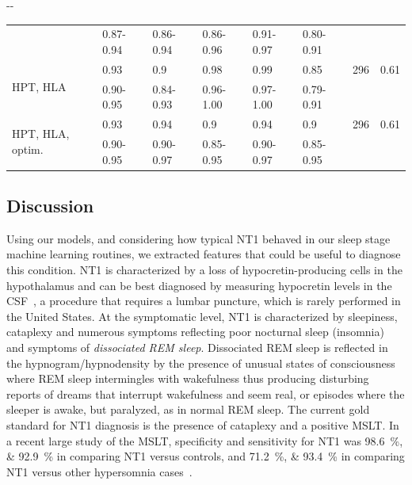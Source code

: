 \begin{table}
\begin{adjustwidth*}{}{-\marginparwidth-\marginparsep}
\begin{tabular}{@{}llllllrr@{}}
                            & 0.87-0.94     & 0.86-0.94        & 0.86-0.96        & 0.91-0.97 & 0.80-0.91 &           &                            \\
        \multirow[t]{2}{0.175\textwidth}{HPT, HLA}            & 0.93          & 0.9              & 0.98             & 0.99      & 0.85      & 296       & 0.61                       \\
                            & 0.90-0.95     & 0.84-0.93        & 0.96-1.00        & 0.97-1.00 & 0.79-0.91 &           &                            \\
        \multirow[t]{2}{0.175\textwidth}{HPT, HLA, optim.}    & 0.93          & 0.94             & 0.9              & 0.94      & 0.9       & 296       & 0.61                       \\
                            & 0.90-0.95     & 0.90-0.97        & 0.85-0.95        & 0.90-0.97 & 0.85-0.95 &           &                            \\ \bottomrule
    \end{tabular}
    \end{adjustwidth*}
\end{table}

\subsection{Discussion}

Using our models, and considering how typical \ac{NT1} behaved in our sleep stage machine learning routines, we extracted features that could be useful to diagnose this condition.
\Ac{NT1} is characterized by a loss of hypocretin-producing cells in the hypothalamus and can be best diagnosed by measuring hypocretin levels in the \ac{CSF}~\cite{Peyron2000,Mignot2002}, a procedure that requires a lumbar puncture, which is rarely performed in the United States.
At the symptomatic level, \ac{NT1} is characterized by sleepiness, cataplexy and numerous symptoms reflecting poor nocturnal sleep (insomnia) and symptoms of \textit{dissociated REM sleep}.
Dissociated \ac{REM} sleep is reflected in the hypnogram/hypnodensity by the presence of unusual states of consciousness where \ac{REM} sleep intermingles with wakefulness thus producing disturbing reports of dreams that interrupt wakefulness and seem real, or episodes where the sleeper is awake, but paralyzed, as in normal REM sleep.
The current gold standard for \ac{NT1} diagnosis is the presence of cataplexy and a positive \ac{MSLT}.
In a recent large study of the \ac{MSLT}, specificity and sensitivity for \ac{NT1} was \SIlist{98.6;92.9}{\percent} in comparing \ac{NT1} versus controls, and \SIlist{71.2;93.4}{\percent} in comparing \ac{NT1} versus other hypersomnia cases~\cite{Andlauer2013}.

